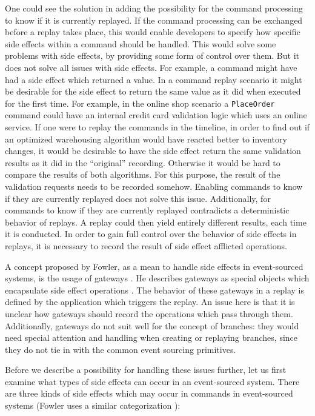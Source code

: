 One could see the solution in adding the possibility for the command processing
to know if it is currently replayed.
If the command processing can be exchanged before a replay takes place, this
would enable developers to specify how specific side effects within a
command should be handled.
This would solve some problems with side effects, by providing some form of 
control over them. But it does not solve all issues with side effects.
For example, a command might have had a side effect which returned a value.
In a command replay scenario it might be desirable for the side effect to 
return the same value as it did when executed for the first time. 
For example, in the online shop scenario a \texttt{PlaceOrder} command could 
have an internal credit card validation logic which uses an online service.
If one were to replay the commands in the timeline, in order to find out if an 
optimized warehousing algorithm would have reacted better to inventory changes, 
it would be desirable to have the side effect return the same validation 
results as it did in the ``original'' recording. Otherwise it would be hard 
to compare the results of both algorithms. 
For this purpose, the result of the validation requests needs to be recorded
somehow.  Enabling commands to know if they are currently replayed does not 
solve this issue.
Additionally, for commands to know if they are currently replayed contradicts
a deterministic behavior of replays. A replay could then yield entirely 
different results, each time it is conducted. 
%
In order to gain full control over the behavior of side effects in replays, it 
is necessary to record the result of side effect afflicted operations.

A concept proposed by Fowler, as a mean to handle side effects in event-sourced 
systems, is the usage of gateways \cite{Fowler2005}. He describes gateways as 
special objects which encapsulate side effect operations \cite[p.~466]{Fowler2002}. 
The behavior of these gateways in a replay is defined by the application which 
triggers the replay. An issue here is that it is unclear how gateways should 
record the operations which pass through them. 
Additionally, gateways do not suit well for the concept of branches: they would
need special attention and handling when creating or replaying branches, since 
they do not tie in with the common event sourcing primitives. 

Before we describe a possibility for handling these issues further, let us first 
examine what types of side effects can occur in an event-sourced system. There 
are three kinds of side effects which may occur in commands in event-sourced 
systems (Fowler uses a similar categorization \cite{Fowler2005}):

